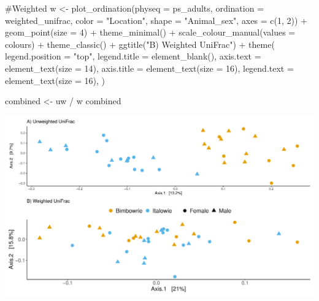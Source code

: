 \documentclass[
  letterpaper,
  DIV=11,
  numbers=noendperiod]{scrartcl}
\newenvironment{Shaded}{\begin{snugshade}}{\end{snugshade}}
\newcommand{\AttributeTok}[1]{\textcolor[rgb]{0.40,0.45,0.13}{#1}}
\newcommand{\CommentTok}[1]{\textcolor[rgb]{0.37,0.37,0.37}{#1}}
\newcommand{\DecValTok}[1]{\textcolor[rgb]{0.68,0.00,0.00}{#1}}
\newcommand{\FunctionTok}[1]{\textcolor[rgb]{0.28,0.35,0.67}{#1}}
\newcommand{\NormalTok}[1]{\textcolor[rgb]{0.00,0.23,0.31}{#1}}
\newcommand{\OtherTok}[1]{\textcolor[rgb]{0.00,0.23,0.31}{#1}}
\newcommand{\SpecialCharTok}[1]{\textcolor[rgb]{0.37,0.37,0.37}{#1}}
\newcommand{\StringTok}[1]{\textcolor[rgb]{0.13,0.47,0.30}{#1}}
\begin{document}
\begin{Shaded}
\begin{Highlighting}[]
\CommentTok{\#Weighted}
\NormalTok{w }\OtherTok{\textless{}{-}} \FunctionTok{plot\_ordination}\NormalTok{(}\AttributeTok{physeq =}\NormalTok{ ps\_adults,}
                \AttributeTok{ordination =}\NormalTok{ weighted\_unifrac,}
                \AttributeTok{color =} \StringTok{"Location"}\NormalTok{,}
                \AttributeTok{shape =} \StringTok{"Animal\_sex"}\NormalTok{,}
                \AttributeTok{axes =} \FunctionTok{c}\NormalTok{(}\DecValTok{1}\NormalTok{, }\DecValTok{2}\NormalTok{)) }\SpecialCharTok{+}
  \FunctionTok{geom\_point}\NormalTok{(}\AttributeTok{size =} \DecValTok{4}\NormalTok{) }\SpecialCharTok{+}
  \FunctionTok{theme\_minimal}\NormalTok{() }\SpecialCharTok{+}
  \FunctionTok{scale\_colour\_manual}\NormalTok{(}\AttributeTok{values =}\NormalTok{ colours) }\SpecialCharTok{+}
  \FunctionTok{theme\_classic}\NormalTok{() }\SpecialCharTok{+}
  \FunctionTok{ggtitle}\NormalTok{(}\StringTok{"B) Weighted UniFrac"}\NormalTok{) }\SpecialCharTok{+}
  \FunctionTok{theme}\NormalTok{(}
    \AttributeTok{legend.position =} \StringTok{"top"}\NormalTok{,}
    \AttributeTok{legend.title =} \FunctionTok{element\_blank}\NormalTok{(),}
    \AttributeTok{axis.text =} \FunctionTok{element\_text}\NormalTok{(}\AttributeTok{size =} \DecValTok{14}\NormalTok{),}
    \AttributeTok{axis.title =} \FunctionTok{element\_text}\NormalTok{(}\AttributeTok{size =} \DecValTok{16}\NormalTok{),}
    \AttributeTok{legend.text =} \FunctionTok{element\_text}\NormalTok{(}\AttributeTok{size =} \DecValTok{16}\NormalTok{),}
\NormalTok{    ) }

\NormalTok{combined }\OtherTok{\textless{}{-}}\NormalTok{ uw }\SpecialCharTok{/}\NormalTok{ w}
\NormalTok{combined}
\end{Highlighting}
\end{Shaded}

\includegraphics{code_files/figure-pdf/unnamed-chunk-5-1.pdf}
\end{document}
